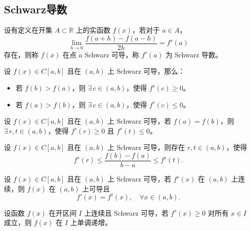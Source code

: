 \documentclass[lang=cn,10pt,thmcnt=section]{elegantbook}
\begin{document}
\subsection{Schwarz导数}
\begin{definition}
	设有定义在开集 \( A \subset \mathbb{R} \) 上的实函数 \( f(x) \)，若对于 \( a \in A \)，
\[ \lim_{h \to 0} \frac{f(a+h)-f(a-h)}{2h} = f^s(a) \]
存在，则称 \( f(x) \) 在点 \( a \) Schwarz 可导，称 \( f^s(a) \) 为 Schwarz 导数。

\end{definition}
\begin{proposition}
	设 \( f(x) \in C[a,b] \) 且在 \( (a,b) \) 上 Schwarz 可导，那么：
\begin{itemize}
    \item 若 \( f(b) > f(a) \)，则 \( \exists\, c \in (a,b) \)，使得 \( f^s(c) \geq 0 \)。
    \item 若 \( f(a) > f(b) \)，则 \( \exists\, c \in (a,b) \)，使得 \( f^s(c) \leq 0 \)。
\end{itemize}

\end{proposition}
\begin{theorem}
	设 \( f(x) \in C[a, b] \) 且在 \( (a, b) \) 上 Schwarz 可导，若 \( f(a) = f(b) \)，则  
\(\exists\, r, t \in (a, b) \)，使得 \( f^s(r) \geq 0 \) 且 \( f^s(t) \leq 0 \)。

\end{theorem}
\begin{theorem}
	设 \( f(x) \in C[a, b] \) 且在 \( (a, b) \) 上 Schwarz 可导，则存在 \( r, t \in (a, b) \)，使得
\[ f^s(r) \leq \frac{f(b) - f(a)}{b - a} \leq f^s(t). \]
\end{theorem}
\begin{theorem}
	设 \( f(x) \in C[a, b] \) 且在 \( (a, b) \) 上 Schwarz 可导，若 \( f^s(x) \) 在 \( (a, b) \) 上连续，则 \( f(x) \) 在 \( (a, b) \) 上可导且
\[ f'(x) = f^s(x), \quad \forall x \in (a, b). \]

\end{theorem}
\begin{theorem}
	设函数 \( f(x) \) 在开区间 \( I \) 上连续且 Schwarz 可导，若 \( f^s(x) \geq 0 \) 对所有 \( x \in I \) 成立，则 \( f(x) \) 在 \( I \) 上单调递增。
\end{theorem}
\end{document}
